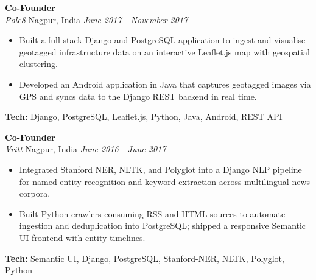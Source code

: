 \documentclass[a4paper,10pt]{article}
\begin{document}
\textbf{Co-Founder}\\
\textit{Pole8} \textbar{} Nagpur, India \textbar{} \textit{\small June 2017 - November 2017}\\
\begin{itemize}[leftmargin=1.5em,itemsep=0pt,parsep=0pt,topsep=0pt,partopsep=0pt]
  \item Built a full-stack Django and PostgreSQL application to ingest and visualise geotagged infrastructure data on an interactive Leaflet.js map with geospatial clustering.
  \item Developed an Android application in Java that captures geotagged images via GPS and syncs data to the Django REST backend in real time.
\end{itemize}
\noindent\textbf{\small Tech:} \small Django, PostgreSQL, Leaflet.js, Python, Java, Android, REST API
\vspace{3pt}

\textbf{Co-Founder}\\
\textit{Vritt} \textbar{} Nagpur, India \textbar{} \textit{\small June 2016 - June 2017}\\
\begin{itemize}[leftmargin=1.5em,itemsep=0pt,parsep=0pt,topsep=0pt,partopsep=0pt]
  \item Integrated Stanford NER, NLTK, and Polyglot into a Django NLP pipeline for named-entity recognition and keyword extraction across multilingual news corpora.
  \item Built Python crawlers consuming RSS and HTML sources to automate ingestion and deduplication into PostgreSQL; shipped a responsive Semantic UI frontend with entity timelines.
\end{itemize}
\noindent\textbf{\small Tech:} \small Semantic UI, Django, PostgreSQL, Stanford-NER, NLTK, Polyglot, Python
\vspace{3pt}
\end{document}
